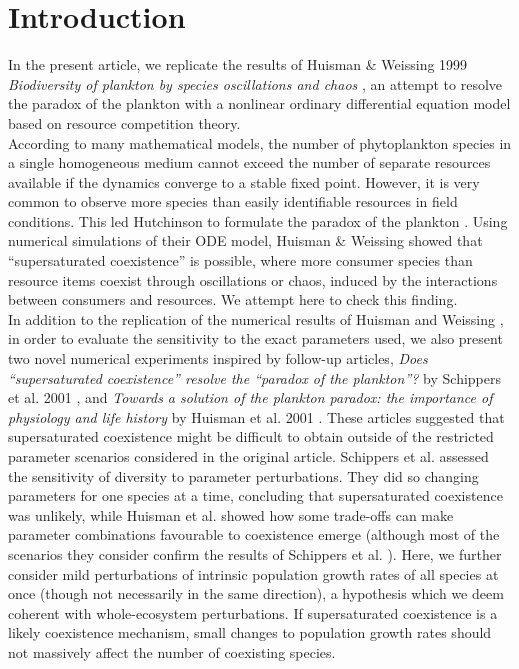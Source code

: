 \section{Introduction}
In the present article, we replicate the results of Huisman \& Weissing 1999 \textit{Biodiversity of plankton by species oscillations and chaos} \cite{1999:Huisman}, an attempt to resolve the paradox of the plankton \cite{1961:Hutchinson} with a nonlinear ordinary differential equation model based on resource competition theory.\\

According to many mathematical models, the number of phytoplankton species in a single homogeneous medium cannot exceed the number of separate resources available \cite{1960:Hardin,1973:Phillips,1980:Armstrong} if the dynamics converge to a stable fixed point. However, it is very common to observe more species than easily identifiable resources in field conditions. This led Hutchinson to formulate the paradox of the plankton \cite{1961:Hutchinson}. Using numerical simulations of their ODE model, Huisman \& Weissing \cite{1999:Huisman} showed that ``supersaturated coexistence'' is possible, where more consumer species than resource items coexist through oscillations or chaos, induced by the interactions between consumers and resources. We attempt here to check this finding. \\

In addition to the replication of the numerical results of Huisman and Weissing \cite{1999:Huisman}, in order to evaluate the sensitivity to the exact parameters used, we also present two novel numerical experiments inspired by follow-up articles, \textit{Does ``supersaturated coexistence'' resolve the ``paradox of the plankton''?} by Schippers et al. 2001 \cite{2001:Schippers}, and \textit{Towards a solution of the plankton paradox: the importance of physiology and life history} by Huisman et al. 2001 \cite{2001:Huisman}. These articles suggested that supersaturated coexistence might be difficult to obtain outside of the restricted parameter scenarios considered in the original article. Schippers et al. \cite{2001:Schippers} assessed the sensitivity of diversity to parameter perturbations. They did so changing parameters for one species at a time, concluding that supersaturated coexistence was unlikely, while Huisman et al. \cite{2001:Huisman} showed how some trade-offs can make parameter combinations favourable to coexistence emerge (although most of the scenarios they consider confirm the results of Schippers et al. \cite{2001:Schippers}). Here, we further consider mild perturbations of intrinsic population growth rates of all species at once (though not necessarily in the same direction), a hypothesis which we deem coherent with whole-ecosystem perturbations. If supersaturated coexistence is a likely coexistence mechanism, small changes to population growth rates should not massively affect the number of coexisting species. 


